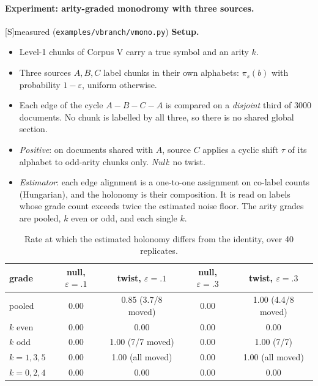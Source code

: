 \documentclass[11pt]{article}
\theoremstyle{definition}
\theoremstyle{remark}
\newcommand{\src}[1]{\textsf{\small[#1]}}
\newcommand{\st}[1]{\textsf{\small\color{gray}#1}}
\begin{document}
\paragraph{Experiment: arity-graded monodromy with three sources.}\src{S}\st{measured} (\texttt{examples/vbranch/vmono.py})
\textbf{Setup.}
\begin{itemize}
  \item Level-1 chunks of Corpus V carry a true symbol and an arity $k$.
  \item Three sources $A,B,C$ label chunks in their own alphabets: $\pi_s(b)$ with probability $1-\varepsilon$, uniform otherwise.
  \item Each edge of the cycle $A\!-\!B\!-\!C\!-\!A$ is compared on a \emph{disjoint} third of 3000 documents. No chunk is labelled by all three, so there is no shared global section.
  \item \emph{Positive}: on documents shared with $A$, source $C$ applies a cyclic shift $\tau$ of its alphabet to odd-arity chunks only. \emph{Null}: no twist.
  \item \emph{Estimator}: each edge alignment is a one-to-one assignment on co-label counts (Hungarian), and the holonomy is their composition. It is read on labels whose grade count exceeds twice the estimated noise floor. The arity grades are pooled, $k$ even or odd, and each single $k$.
\end{itemize}
\begin{table}[h]\centering\small
\begin{tabular}{lcccc}
\toprule
grade & null, $\varepsilon=.1$ & twist, $\varepsilon=.1$ & null, $\varepsilon=.3$ & twist, $\varepsilon=.3$\\
\midrule
pooled & 0.00 & 0.85 (3.7/8 moved) & 0.00 & 1.00 (4.4/8 moved)\\
$k$ even & 0.00 & 0.00 & 0.00 & 0.00\\
$k$ odd & 0.00 & 1.00 (7/7 moved) & 0.00 & 1.00 (7/7)\\
$k=1,3,5$ & 0.00 & 1.00 (all moved) & 0.00 & 1.00 (all moved)\\
$k=0,2,4$ & 0.00 & 0.00 & 0.00 & 0.00\\
\bottomrule
\end{tabular}
\caption{Rate at which the estimated holonomy differs from the identity, over 40 replicates.}
\end{table}
\end{document}

